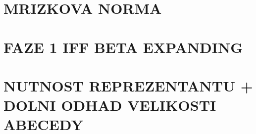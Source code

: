\documentclass[a4paper, 11pt]{report}
\begin{document}

\newpage
\section{MRIZKOVA NORMA}


\section{FAZE 1 IFF BETA EXPANDING}



\section{NUTNOST REPREZENTANTU + DOLNI ODHAD VELIKOSTI ABECEDY}



\newpage


\end{document}
